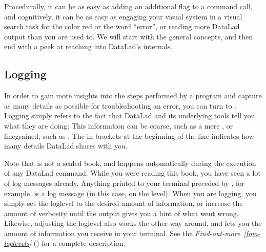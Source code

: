 \sphinxAtStartPar
Procedurally, it can be as easy as adding an additional flag to a command call, and cognitively, it can be as easy as engaging your visual system in a visual search task for the color red or the word “error”, or reading more DataLad output than you are used to.
We will start with the general concepts, and then end with a peek at reaching into DataLad’s internals.


\subsection{Logging}
\label{\detokenize{basics/101-135-help:logging}}\label{\detokenize{basics/101-135-help:id2}}
\sphinxAtStartPar
In order to gain more insights into the steps performed by a program and capture as many details as possible for troubleshooting an error, you can turn to {\hyperref[\detokenize{glossary:term-logging}]{}}.
Logging simply refers to the fact that DataLad and its underlying tools tell you what they are doing:
This information can be coarse, such as a mere , or fine\sphinxhyphen{}grained, such as .
The {\hyperref[\detokenize{glossary:term-log-level}]{}} in brackets at the beginning of the line indicates how many details DataLad shares with you.

\sphinxAtStartPar
Note that {\hyperref[\detokenize{glossary:term-logging}]{}} is not a sealed book, and happens automatically during the execution of any DataLad command.
While you were reading this book, you have seen a lot of log messages already.
Anything printed to your terminal preceded by \sphinxcode{\sphinxupquote{{[}INFO{]}}}, for example, is a log message (in this case, on the  level).
When you are  logging, you simply set the log\sphinxhyphen{}level to the desired amount of information, or increase the amount of verbosity until the output gives you a hint of what went wrong.
Likewise, adjusting the log\sphinxhyphen{}level also works the other way around, and lets you  the amount of information you receive in your terminal.
See the \textit{Find-out-more}~{\findoutmoreiconinline}\textit{\ref{fom-loglevels}} {\hyperref[\detokenize{basics/101-135-help:fom-loglevels}]{}} () for a complete description.

